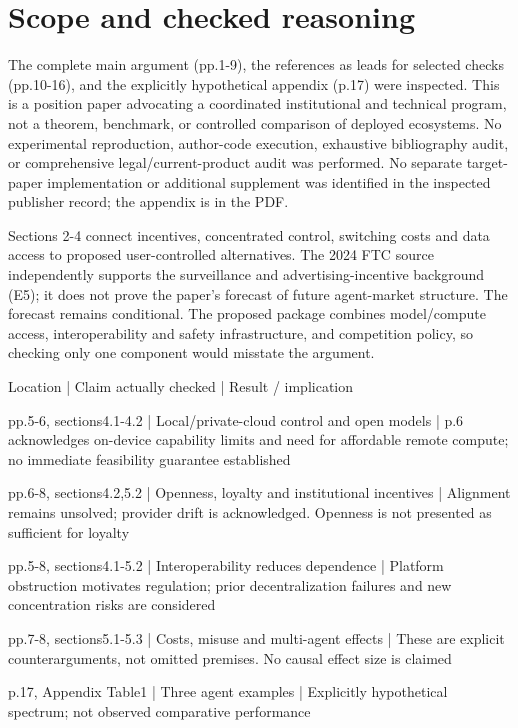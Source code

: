 \documentclass[10pt]{article}
\begin{document}
\section*{Scope and checked reasoning}
The complete main argument (pp.1-9), the references as leads for selected checks (pp.10-16), and the explicitly hypothetical appendix (p.17) were inspected. This is a position paper advocating a coordinated institutional and technical program, not a theorem, benchmark, or controlled comparison of deployed ecosystems. No experimental reproduction, author-code execution, exhaustive bibliography audit, or comprehensive legal/current-product audit was performed. No separate target-paper implementation or additional supplement was identified in the inspected publisher record; the appendix is in the PDF.\par
Sections 2-4 connect incentives, concentrated control, switching costs and data access to proposed user-controlled alternatives. The 2024 FTC source independently supports the surveillance and advertising-incentive background (E5); it does not prove the paper’s forecast of future agent-market structure. The forecast remains conditional. The proposed package combines model/compute access, interoperability and safety infrastructure, and competition policy, so checking only one component would misstate the argument.\par
Location | Claim actually checked | Result / implication\par
pp.5-6, sections4.1-4.2 | Local/private-cloud control and open models | p.6 acknowledges on-device capability limits and need for affordable remote compute; no immediate feasibility guarantee established\par
pp.6-8, sections4.2,5.2 | Openness, loyalty and institutional incentives | Alignment remains unsolved; provider drift is acknowledged. Openness is not presented as sufficient for loyalty\par
pp.5-8, sections4.1-5.2 | Interoperability reduces dependence | Platform obstruction motivates regulation; prior decentralization failures and new concentration risks are considered\par
pp.7-8, sections5.1-5.3 | Costs, misuse and multi-agent effects | These are explicit counterarguments, not omitted premises. No causal effect size is claimed\par
p.17, Appendix Table1 | Three agent examples | Explicitly hypothetical spectrum; not observed comparative performance\par
\end{document}

